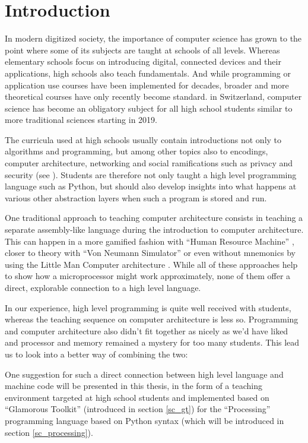 
\chapter{Introduction}

In modern digitized society, the importance of computer science has grown to the point where some of its subjects are taught at schools of all levels. Whereas elementary schools focus on introducing digital, connected devices and their applications, high schools also teach fundamentals. And while programming or application use courses have been implemented for decades, broader and more theoretical courses have only recently become standard. \eg in Switzerland, computer science has become an obligatory subject for all high school students similar to more traditional sciences starting in 2019.

The curricula used at high schools usually contain introductions not only to algorithms and programming, but among other topics also to encodings, computer architecture, networking and social ramifications such as privacy and security (see \eg \cite{Erz16}). Students are therefore not only taught a high level programming language such as Python, but should also develop insights into what happens at various other abstraction layers when such a program is stored and run.

One traditional approach to teaching computer architecture consists in teaching a separate assembly-like language during the introduction to computer architecture. This can happen in a more gamified fashion \eg with ``Human Resource Machine'' \cite{Tom15}, closer to theory with ``Von Neumann Simulator'' \cite{Gan23} or even without mnemonics by using the Little Man Computer architecture \cite{Oin25}. While all of these approaches help to show how a microprocessor might work approximately, none of them offer a direct, explorable connection to a high level language.

In our experience, high level programming is quite well received with students, whereas the teaching sequence on computer architecture is less so. Programming and computer architecture also didn't fit together as nicely as we'd have liked and processor and memory remained a mystery for too many students. This lead us to look into a better way of combining the two:

One suggestion for such a direct connection between high level language and machine code will be presented in this thesis, in the form of a teaching environment targeted at high school students and implemented based on ``Glamorous Toolkit'' (introduced in section \ref{sc_gt}) for the ``Processing'' programming language based on Python syntax (which will be introduced in section \ref{sc_processing}).

